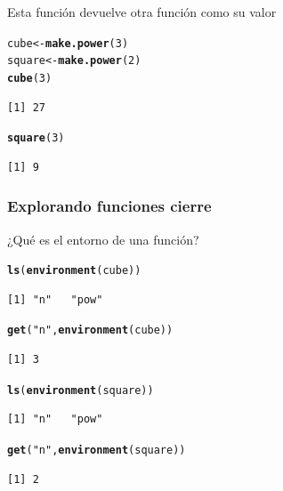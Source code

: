\documentclass{article}\usepackage[]{graphicx}\usepackage[]{color}
\makeatletter
\newcommand{\hlnum}[1]{\textcolor[rgb]{0.686,0.059,0.569}{#1}}%
\newcommand{\hlstr}[1]{\textcolor[rgb]{0.192,0.494,0.8}{#1}}%
\newcommand{\hlstd}[1]{\textcolor[rgb]{0.345,0.345,0.345}{#1}}%
\newcommand{\hlkwb}[1]{\textcolor[rgb]{0.69,0.353,0.396}{#1}}%
\newcommand{\hlkwd}[1]{\textcolor[rgb]{0.737,0.353,0.396}{\textbf{#1}}}%
\newenvironment{kframe}{%
 \def\at@end@of@kframe{}%
 \ifinner\ifhmode%
  \def\at@end@of@kframe{\end{minipage}}%
  \begin{minipage}{\columnwidth}%
 \fi\fi%
 \def\FrameCommand##1{\hskip\@totalleftmargin \hskip-\fboxsep
 \colorbox{shadecolor}{##1}\hskip-\fboxsep
     \hskip-\linewidth \hskip-\@totalleftmargin \hskip\columnwidth}%
 \MakeFramed {\advance\hsize-\width
   \@totalleftmargin\z@ \linewidth\hsize
   \@setminipage}}%
 {\par\unskip\endMakeFramed%
 \at@end@of@kframe}
\newenvironment{knitrout}{}{} %
\makeatother
\begin{document}
    Esta función devuelve otra función como su valor
\begin{knitrout}
\color{fgcolor}\begin{kframe}
\begin{alltt}
  \hlstd{cube} \hlkwb{<-} \hlkwd{make.power}\hlstd{(}\hlnum{3}\hlstd{)}
  \hlstd{square} \hlkwb{<-} \hlkwd{make.power}\hlstd{(}\hlnum{2}\hlstd{)}
  \hlkwd{cube}\hlstd{(}\hlnum{3}\hlstd{)}
\end{alltt}
\begin{verbatim}
[1] 27
\end{verbatim}
\begin{alltt}
  \hlkwd{square}\hlstd{(}\hlnum{3}\hlstd{)}
\end{alltt}
\begin{verbatim}
[1] 9
\end{verbatim}
\end{kframe}
\end{knitrout}

    \subsubsection{Explorando funciones cierre}
    ¿Qué es el entorno de una función?
\begin{knitrout}
\color{fgcolor}\begin{kframe}
\begin{alltt}
  \hlkwd{ls}\hlstd{(}\hlkwd{environment}\hlstd{(cube))}
\end{alltt}
\begin{verbatim}
[1] "n"   "pow"
\end{verbatim}
\begin{alltt}
  \hlkwd{get}\hlstd{(}\hlstr{"n"}\hlstd{,} \hlkwd{environment}\hlstd{(cube))}
\end{alltt}
\begin{verbatim}
[1] 3
\end{verbatim}
\begin{alltt}
  \hlkwd{ls}\hlstd{(}\hlkwd{environment}\hlstd{(square))}
\end{alltt}
\begin{verbatim}
[1] "n"   "pow"
\end{verbatim}
\begin{alltt}
  \hlkwd{get}\hlstd{(}\hlstr{"n"}\hlstd{,} \hlkwd{environment}\hlstd{(square))}
\end{alltt}
\begin{verbatim}
[1] 2
\end{verbatim}
\end{kframe}
\end{knitrout}
    
\end{document}
